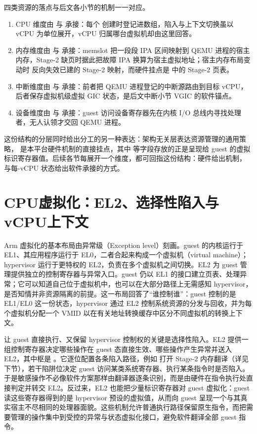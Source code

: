 四类资源的落点与后文各小节的机制一一对应。
\begin{enumerate}[label=\arabic*.,leftmargin=2.5em,itemsep=2pt]
\item CPU 维度由  与  承接：每个  创建时登记进数组，陷入与上下文切换虽以 vCPU 为单位展开，vCPU 归属哪台虚拟机却由这里回答。
\item 内存维度由  与  承接：memslot 把一段段 IPA 区间映射到 QEMU 进程的宿主内存，Stage-2 缺页时据此把故障 IPA 换算为宿主虚拟地址；宿主内存布局变动时  反向失效已建的 Stage-2 映射，而硬件挂点是  中的 Stage-2 页表。
\item 中断维度由  与  承接：前者把 QEMU 进程登记的中断源路由到目标 vCPU，后者保存虚拟机级虚拟 GIC 状态，是后文中断小节 VGIC 的软件锚点。
\item 设备维度由  与  承接：guest 访问设备寄存器先在内核 I/O 总线内寻找处理者，无人认领才交回 QEMU 进程。
\end{enumerate}
这份结构的分层同时给出分工的另一种表达：架构无关层表达资源管理的通用策略， 是本平台硬件机制的直接挂点，其中  等字段存放的正是呈现给 guest 的虚拟标识寄存器值。后续各节每展开一个维度，都可回指这份结构：硬件给出机制， 与每-vCPU 状态给出软件承接的方式。

\section{CPU虚拟化：EL2、选择性陷入与vCPU上下文}\label{sec:hardware-cpu}

Arm 虚拟化的基本布局由异常级（Exception level）刻画。guest 的内核运行于 EL1、其应用程序运行于 EL0，二者合起来构成一个虚拟机（virtual machine）；hypervisor 运行于更特权的 EL2，负责在多个虚拟机之间切换\cite{source4}。EL2 为 guest 管理提供独立的控制寄存器与异常入口。guest 仍以 EL1 的接口建立页表、处理异常；它可以知道自己位于虚拟机中，也可以在大部分路径上无需感知 hypervisor，是否知情并非资源隔离的前提\cite{source4}。这一布局回答了“谁控制谁”：guest 控制的是 EL1/EL0 这一份状态，hypervisor 通过 EL2 控制系统资源的分发与回收，并为每个虚拟机分配一个 VMID 以在有关地址转换缓存中区分不同虚拟机的转换上下文。

让 guest 直接执行、又保留 hypervisor 控制权的关键是选择性陷入。EL2 提供一组控制寄存器决定哪些操作在 guest 态直接生效、哪些操作产生异常并送入 EL2，其中枢是 。它逐位配置各条陷入路径，例如  打开 Stage-2 内存翻译（详见下节），若干陷阱位决定 guest 访问某类系统寄存器、执行某条指令时是否陷入。于是敏感操作不必像软件方案那样由翻译器逐条识别，而是由硬件在指令执行处直接判定并转交 EL2。反过来，EL2 也能把少量标识寄存器对 guest 虚拟化：guest 读这些寄存器得到的是 hypervisor 预设的虚拟值，从而向 guest 呈现一个与其真实宿主不尽相同的处理器面貌\cite{source4}。这些机制允许普通执行路径保留原生指令，而把需要管理的操作集中到受控的异常与状态虚拟化接口，避免软件翻译全部 guest 指令。


